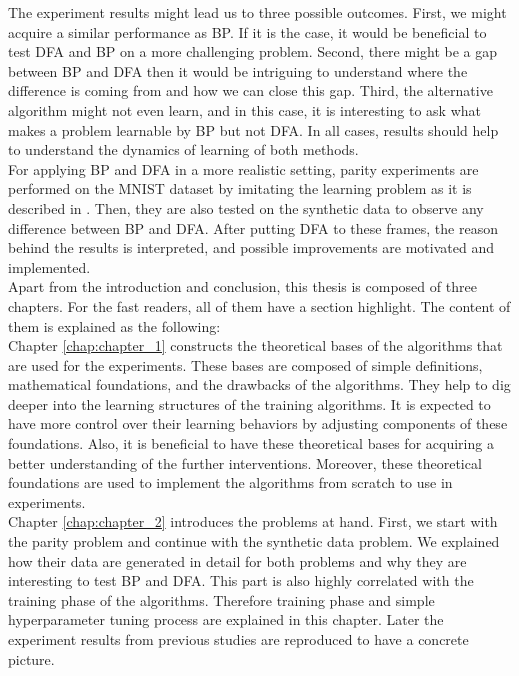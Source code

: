 \documentclass[a4paper, nobind]{templates/ociamthesis}
\begin{document}
The experiment results might lead us to three possible outcomes. First, we might acquire a similar performance as BP. If it is the case, it would be beneficial to test DFA and BP on a more challenging problem. Second, there might be a gap between BP and DFA then it would be intriguing to understand where the difference is coming from and how we can close this gap. Third, the alternative algorithm might not even learn, and in this case, it is interesting to ask what makes a problem learnable by BP but not DFA. In all cases, results should help to understand the dynamics of learning of both methods.\\
For applying BP and DFA in a more realistic setting, parity experiments are performed on the MNIST dataset by imitating the learning problem as it is described in \cite{DBLP:journals/corr/abs-2002-07400}. Then, they are also tested on the synthetic data to observe any difference between BP and DFA. After putting DFA to these frames, the reason behind the results is interpreted, and possible improvements are motivated and implemented.\\
Apart from the introduction and conclusion, this thesis is composed of three chapters. For the fast readers, all of them have a section highlight. The content of them is explained as the following:\\
Chapter \ref{chap:chapter_1} constructs the theoretical bases of the algorithms that are used for the experiments. These bases are composed of simple definitions, mathematical foundations, and the drawbacks of the algorithms. They help to dig deeper into the learning structures of the training algorithms. It is expected to have more control over their learning behaviors by adjusting components of these foundations. Also, it is beneficial to have these theoretical bases for acquiring a better understanding of the further interventions. Moreover, these theoretical foundations are used to implement the algorithms from scratch to use in experiments.\\
Chapter \ref{chap:chapter_2} introduces the problems at hand. First, we start with the parity problem and continue with the synthetic data problem. We explained how their data are generated in detail for both problems and why they are interesting to test BP and DFA. This part is also highly correlated with the training phase of the algorithms. Therefore training phase and simple hyperparameter tuning process are explained in this chapter. Later the experiment results from previous studies \cite{DBLP:journals/corr/abs-2002-07400, chizat2020implicit} are reproduced to have a concrete picture.\\
\end{document}
